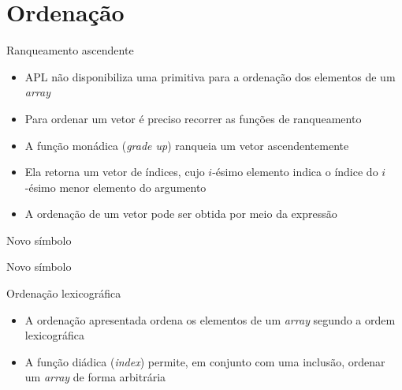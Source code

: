 \section{Ordenação}

\begin{frame}[fragile]{Ranqueamento ascendente}

    \begin{itemize}
        \item APL não disponibiliza uma primitiva para a ordenação dos elementos de um
            \textit{array}
        \pause

        \item Para ordenar um vetor é preciso recorrer as funções de ranqueamento
        \pause

        \item A função monádica  (\textit{grade up}) ranqueia um vetor
            ascendentemente
        \pause

        \item Ela retorna um vetor de índices, cujo $i$-ésimo elemento indica
            o índice do $i$-ésimo menor elemento do argumento
        \pause

        \item A ordenação de um vetor pode ser obtida por meio da expressão 
    \end{itemize}

\end{frame}

\begin{frame}[fragile]{Novo símbolo}


\end{frame}

\begin{frame}[fragile]{Novo símbolo}


\end{frame}

\begin{frame}[fragile]{Ordenação lexicográfica}

    \begin{itemize}
        \item A ordenação apresentada ordena os elementos de um \textit{array} segundo a ordem
            lexicográfica
        \pause

        \item A função diádica  (\textit{index}) permite, em conjunto com uma inclusão,
            ordenar um \textit{array} de forma arbitrária
    \end{itemize}

\end{frame}

